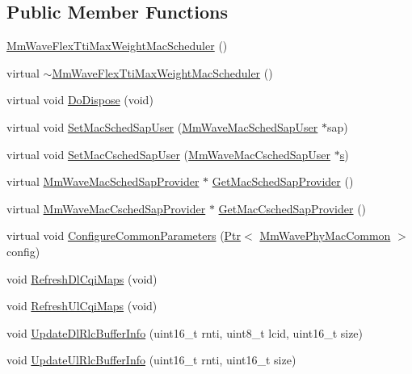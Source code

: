 \subsection*{Public Member Functions}
\begin{DoxyCompactItemize}
\item 
\hyperlink{classns3_1_1MmWaveFlexTtiMaxWeightMacScheduler_a474d216bef4058928f46d2f981097db6}{Mm\+Wave\+Flex\+Tti\+Max\+Weight\+Mac\+Scheduler} ()
\item 
virtual \hyperlink{classns3_1_1MmWaveFlexTtiMaxWeightMacScheduler_ab7111de00a1659d6c4b666a54ffbaa2c}{$\sim$\+Mm\+Wave\+Flex\+Tti\+Max\+Weight\+Mac\+Scheduler} ()
\item 
virtual void \hyperlink{classns3_1_1MmWaveFlexTtiMaxWeightMacScheduler_a2f04e23dfbdc9c636885961a235818ed}{Do\+Dispose} (void)
\item 
virtual void \hyperlink{classns3_1_1MmWaveFlexTtiMaxWeightMacScheduler_a17e51ec70435da322229cdc0a9852bfe}{Set\+Mac\+Sched\+Sap\+User} (\hyperlink{classns3_1_1MmWaveMacSchedSapUser}{Mm\+Wave\+Mac\+Sched\+Sap\+User} $\ast$sap)
\item 
virtual void \hyperlink{classns3_1_1MmWaveFlexTtiMaxWeightMacScheduler_ae2a80780d33741371c6b82d410ad4a73}{Set\+Mac\+Csched\+Sap\+User} (\hyperlink{classns3_1_1MmWaveMacCschedSapUser}{Mm\+Wave\+Mac\+Csched\+Sap\+User} $\ast$\hyperlink{generate__test__data__lte__sinr_8m_ad83eeb3a142285d1243a08c6b7026df8}{s})
\item 
virtual \hyperlink{classns3_1_1MmWaveMacSchedSapProvider}{Mm\+Wave\+Mac\+Sched\+Sap\+Provider} $\ast$ \hyperlink{classns3_1_1MmWaveFlexTtiMaxWeightMacScheduler_a4c38ab427838c87516d473f5e6637944}{Get\+Mac\+Sched\+Sap\+Provider} ()
\item 
virtual \hyperlink{classns3_1_1MmWaveMacCschedSapProvider}{Mm\+Wave\+Mac\+Csched\+Sap\+Provider} $\ast$ \hyperlink{classns3_1_1MmWaveFlexTtiMaxWeightMacScheduler_ac786cdd84e17867462b43c07bc8c1ba4}{Get\+Mac\+Csched\+Sap\+Provider} ()
\item 
virtual void \hyperlink{classns3_1_1MmWaveFlexTtiMaxWeightMacScheduler_af730f03f72ac2eb36b5f62af1785883e}{Configure\+Common\+Parameters} (\hyperlink{classns3_1_1Ptr}{Ptr}$<$ \hyperlink{classns3_1_1MmWavePhyMacCommon}{Mm\+Wave\+Phy\+Mac\+Common} $>$ config)
\item 
void \hyperlink{classns3_1_1MmWaveFlexTtiMaxWeightMacScheduler_a11fa932028c47348c6c0ec88fcdab0fd}{Refresh\+Dl\+Cqi\+Maps} (void)
\item 
void \hyperlink{classns3_1_1MmWaveFlexTtiMaxWeightMacScheduler_a01931ad90307741598274c09b467ecef}{Refresh\+Ul\+Cqi\+Maps} (void)
\item 
void \hyperlink{classns3_1_1MmWaveFlexTtiMaxWeightMacScheduler_ac7ce148c5e22238735587213a54ad938}{Update\+Dl\+Rlc\+Buffer\+Info} (uint16\+\_\+t rnti, uint8\+\_\+t lcid, uint16\+\_\+t size)
\item 
void \hyperlink{classns3_1_1MmWaveFlexTtiMaxWeightMacScheduler_a3ee659a219001f9940124a7c0b5420bf}{Update\+Ul\+Rlc\+Buffer\+Info} (uint16\+\_\+t rnti, uint16\+\_\+t size)
\end{DoxyCompactItemize}
